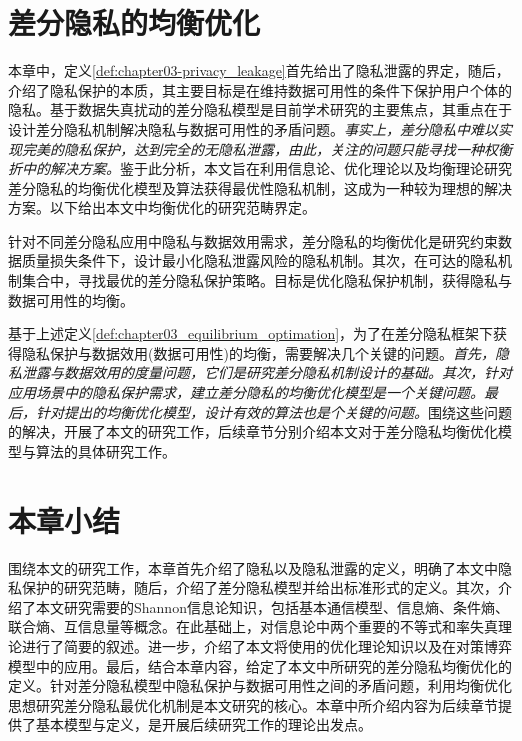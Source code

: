 \section{差分隐私的均衡优化}
本章中，定义\ref{def:chapter03-privacy_leakage}首先给出了隐私泄露的界定，随后，介绍了隐私保护的本质，其主要目标是在维持数据可用性的条件下保护用户个体的隐私。基于数据失真扰动的差分隐私模型是目前学术研究的主要焦点，其重点在于设计差分隐私机制解决隐私与数据可用性的矛盾问题。{\em 事实上，差分隐私中难以实现完美的隐私保护，达到完全的无隐私泄露，由此，关注的问题只能寻找一种权衡折中的解决方案。}鉴于此分析，本文旨在利用信息论、优化理论以及均衡理论研究差分隐私的均衡优化模型及算法获得最优性隐私机制，这成为一种较为理想的解决方案。以下给出本文中均衡优化的研究范畴界定。

\begin{definition}\label{def:chapter03_equilibrium_optimation}
	针对不同差分隐私应用中隐私与数据效用需求，差分隐私的均衡优化是研究约束数据质量损失条件下，设计最小化隐私泄露风险的隐私机制。其次，在可达的隐私机制集合中，寻找最优的差分隐私保护策略。目标是优化隐私保护机制，获得隐私与数据可用性的均衡。
\end{definition}

基于上述定义\ref{def:chapter03_equilibrium_optimation}，为了在差分隐私框架下获得隐私保护与数据效用(数据可用性)的均衡，需要解决几个关键的问题。{\em 首先，隐私泄露与数据效用的度量问题，它们是研究差分隐私机制设计的基础。其次，针对应用场景中的隐私保护需求，建立差分隐私的均衡优化模型是一个关键问题。最后，针对提出的均衡优化模型，设计有效的算法也是个关键的问题。}围绕这些问题的解决，开展了本文的研究工作，后续章节分别介绍本文对于差分隐私均衡优化模型与算法的具体研究工作。
\section{本章小结}

围绕本文的研究工作，本章首先介绍了隐私以及隐私泄露的定义，明确了本文中隐私保护的研究范畴，随后，介绍了差分隐私模型并给出标准形式的定义。其次，介绍了本文研究需要的Shannon信息论知识，包括基本通信模型、信息熵、条件熵、联合熵、互信息量等概念。在此基础上，对信息论中两个重要的不等式和率失真理论进行了简要的叙述。进一步，介绍了本文将使用的优化理论知识以及在对策博弈模型中的应用。最后，结合本章内容，给定了本文中所研究的差分隐私均衡优化的定义。针对差分隐私模型中隐私保护与数据可用性之间的矛盾问题，利用均衡优化思想研究差分隐私最优化机制是本文研究的核心。本章中所介绍内容为后续章节提供了基本模型与定义，是开展后续研究工作的理论出发点。

